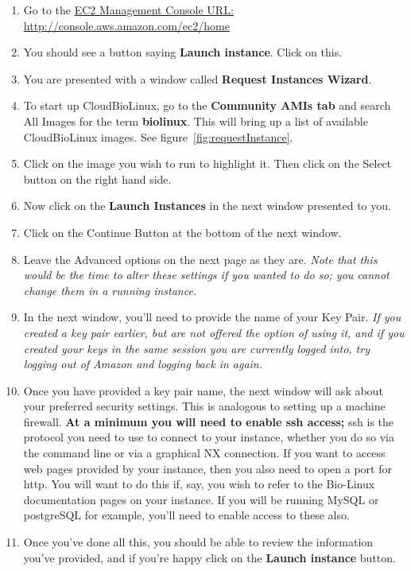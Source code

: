 \begin{enumerate}
\item Go to the \href{http://console.aws.amazon.com/ec2/home}{EC2 Management Console URL: http://console.aws.amazon.com/ec2/home}
\item You should see a button saying \textbf{Launch instance}. Click on this. 
\item You are presented with a window called \textbf{Request Instances Wizard}. 
\item To start up CloudBioLinux, go to the \textbf{Community AMIs tab} and search All Images for the term \textbf{biolinux}. This will bring up a list of available CloudBioLinux images. See figure~\ref{fig:requestInstance}.
\item Click on the image you wish to run to highlight it. Then click on the Select button on the right hand side. 
\item Now click on the \textbf{Launch Instances} in the next window presented to you.
\item Click on the Continue Button at the bottom of the next window. 
\item Leave the Advanced options on the next page as they are. \emph{Note that this would be the time to alter these settings if you wanted to do so; you cannot change them in a running instance.}
\item In the next window, you'll need to provide the name of your Key Pair. \emph{If you created a key pair earlier, but are not offered the option of using it, and if you created your keys in the same session you are currently logged into, try logging out of Amazon and logging back in again.}
\item Once you have provided a key pair name, the next window will ask about your preferred security settings. This is analogous to setting up a machine firewall. \textbf{At a minimum you will need to enable ssh access;} ssh is the protocol you need to use to connect to your instance, whether you do so via the command line or via a graphical NX connection. If you want to access web pages provided by your instance, then you also need to open a port for http. You will want to do this if, say, you wish to refer to the Bio-Linux documentation pages on your instance. If you will be running MySQL or postgreSQL for example, you'll need to enable access to these also.
\item Once you've done all this, you should be able to review the information you've provided, and if you're happy click on the \textbf{Launch instance} button.
\end{enumerate}

